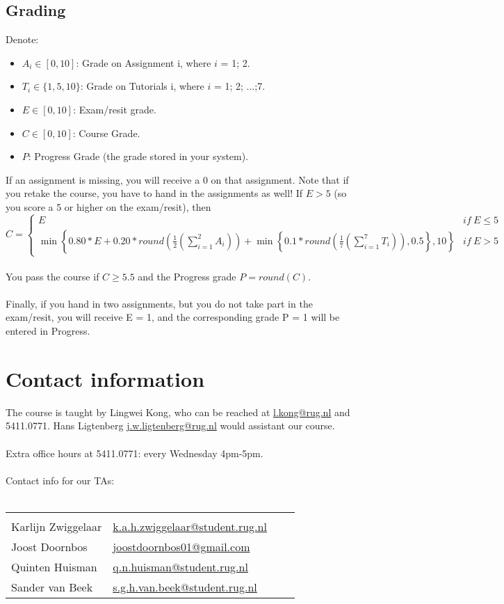 \documentclass[openany]{article}
\begin{document}
\subsection{Grading}
Denote: 
\begin{itemize}
	\item $A_i\in [0,10]$: Grade on Assignment i, where $i$ = 1; 2.	
	\item $T_i\in \{1, 5, 10\}$: Grade on Tutorials i, where $i$ = 1; 2; ...;7.	
	\item $E\in [0,10]$: Exam/resit grade.  
	\item $C\in [0,10]$: Course Grade.
	\item $P$: Progress Grade (the grade stored in your system).
\end{itemize}
If an assignment is missing, you will receive a 0 on that assignment. Note
that if you retake the course, you have to hand in the assignments as well!
If $E > 5$ (so you score a 5 or higher on the exam/resit), then
{\scriptsize $$C=\left\{ \begin{matrix}
E & \textit{if}~E\leq 5 \\
\min \left\{ 0.80*E + 0.20* \textit{round}\left( \frac{1}{2}   (\sum_{i=1}^{2}A_i)  \right)+ \min \left\{0.1* \textit{round}\left( \frac{1}{7} (\sum_{i=1}^{7}T_i)  \right), 0.5\right\}, 10 \right\} & \textit{if} ~E> 5
\end{matrix} \right. $$}~\\
 You pass the course if $C\geq 5.5$ and the Progress grade $P = \textit{round}(C)$.\\~\\ Finally, if you hand in two assignments, but you do not take part
 in the exam/resit, you will receive E = 1, and the corresponding grade P = 1 will
 be entered in Progress.
\section{Contact information}
The course is taught by Lingwei Kong, who can be reached at
\href{mailto:l.kong@rug.nl}{l.kong@rug.nl} and 5411.0771. Hans Ligtenberg \href{mailto:j.w.ligtenberg@rug.nl}{j.w.ligtenberg@rug.nl} would assistant our course.\\~\\
Extra office hours at 5411.0771: every Wednesday 4pm-5pm.\\~\\
Contact info for our TAs:\\~\\
\begin{tabular}{llll} 
		\hline	\hline\\
	Karlijn Zwiggelaar& \href{mailto:k.a.h.zwiggelaar@student.rug.nl}{k.a.h.zwiggelaar@student.rug.nl} \\
	Joost Doornbos& \href{mailto:joostdoornbos01@gmail.com}{joostdoornbos01@gmail.com} \\
	Quinten Huisman&  \href{mailto:q.n.huisman@student.rug.nl}{q.n.huisman@student.rug.nl} \\
	Sander van Beek& \href{mailto:s.g.h.van.beek@student.rug.nl}{s.g.h.van.beek@student.rug.nl} \\	\hline
\end{tabular}
 
\end{document}
